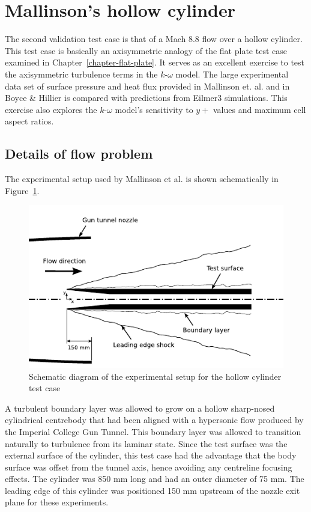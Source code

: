 %
\newpage
\section{Mallinson's hollow cylinder}
\label{chapter-cylinder}
%
The second validation test case is that of a Mach 8.8 flow 
over a hollow cylinder. This test case is basically an axisymmetric
analogy of the flat plate test case examined in Chapter~\ref{chapter-flat-plate}. 
It serves as an excellent exercise to test the axisymmetric turbulence 
terms in the $k$-$\omega$ model. The large experimental data set of surface 
pressure and heat flux provided in Mallinson et. al. \cite{Mallinson2000} 
and in Boyce \& Hillier \cite{Boyce2000} is compared with predictions from 
Eilmer3 simulations. This exercise also explores the $k$-$\omega$ model's
sensitivity to $y+$ values and maximum cell aspect ratios.

\subsection{Details of flow problem}
%
The experimental setup used by Mallinson et al. is shown 
schematically in Figure~\ref{figure-cylinder-exp-setup}.
%
\begin{figure}[htbp]
\begin{center}
\includegraphics[width=13cm]{./chap3-mallinson-cylinder/figs/experimental-setup.pdf}
\end{center}
\caption{Schematic diagram of the experimental setup for the hollow 
         cylinder test case}
\label{figure-cylinder-exp-setup}
\end{figure}
%
A turbulent boundary layer was allowed to grow on a hollow sharp-nosed 
cylindrical centrebody that had been aligned with a hypersonic flow 
produced by the Imperial College Gun Tunnel. This boundary layer was 
allowed to transition naturally to turbulence from its laminar 
state. Since the test surface was the external surface of the cylinder, 
this test case had the advantage that the body surface was offset from 
the tunnel axis, hence avoiding any centreline focusing effects. The
cylinder was 850 mm long and had an outer diameter of 75 mm. The leading
edge of this cylinder was positioned 150 mm upstream of the nozzle exit
plane for these experiments.

